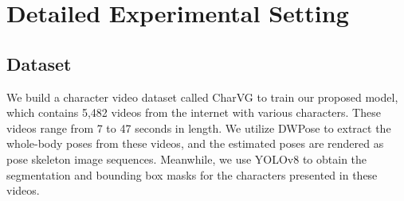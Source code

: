 \appendix







\section{Detailed Experimental Setting}
\label{sec:appendix_exp_setting}


\subsection{Dataset}
We build a character video dataset called CharVG to train our proposed model, which contains 5,482 videos from the internet with various characters.
These videos range from 7 to 47 seconds in length.
We utilize DWPose \cite{yang2023effective} to extract the whole-body poses from these videos, and the estimated poses are rendered as pose skeleton image sequences.
Meanwhile, we use YOLOv8 \cite{reis2023real} to obtain the segmentation and bounding box masks for the characters presented in these videos.

